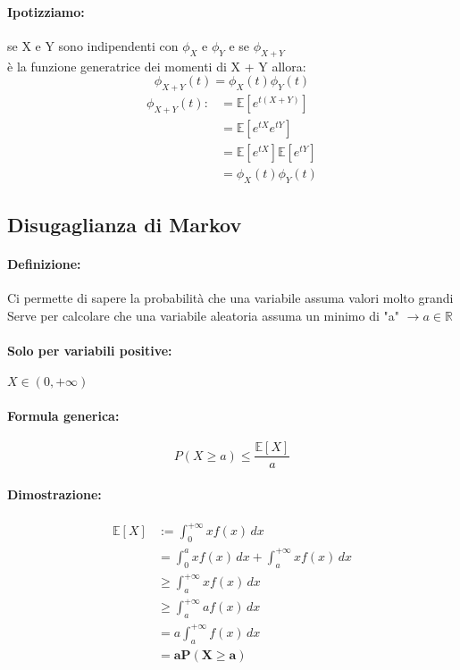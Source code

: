 \documentclass[]{article}
\newcommand{\ev}{\mathbb{E}[X]}
\renewcommand{\ev}[1]{\mathbb{E}[#1]}
\newcommand{\definizione}{\paragraph{Definizione:}}
\newcommand{\formula}{\paragraph{Formula generica:}}
\begin{document}
    \paragraph{Ipotizziamo:} se X e Y sono indipendenti con $\phi_X$ e $\phi_Y$ e se $\phi_{X + Y}$ \\
    è la funzione generatrice dei momenti di X + Y allora:
    \[ \phi_{X + Y}(t) = \phi_X(t) \phi_Y(t) \]
    \begin{equation*}
        \begin{split}
            \phi_{X + Y}(t) :&= \ev{e^{t(X + Y)}} \\
            & = \ev{e^{tX} e^{tY}} \\
            & = \ev{e^{tX}} \ev{e^{tY}} \\
            & = \phi_X(t) \phi_Y(t)
        \end{split}
    \end{equation*}
    \subsection{Disugaglianza di Markov}
    \definizione Ci permette di sapere la probabilità che una variabile assuma valori molto grandi \\
    Serve per calcolare che una variabile aleatoria assuma un minimo di "a" $\longrightarrow a \in \mathbb{R}$

    \paragraph{Solo per variabili positive:} $X \in (0, +\infty) $
    \formula \[ P(X \geq a) \leq \frac{\ev{X}}{a}\]

    \paragraph{Dimostrazione:}
    \begin{equation*}
        \begin{split}
            \ev{X} & := \int_{0}^{+\infty} xf(x) \, dx \\
            & = \int_{0}^{a} x f(x) \, dx + \int_{a}^{+\infty} x f(x) \, dx \\ 
            & \geq \int_{a}^{+\infty} x f(x) \, dx \\ 
            & \geq \int_{a}^{+\infty} a f(x) \, dx \\
            & = a \int_{a}^{+\infty} f(x) \, dx \\ 
            & = \boldsymbol{aP(X \geq a)}
        \end{split}
    \end{equation*}
    
\end{document}

